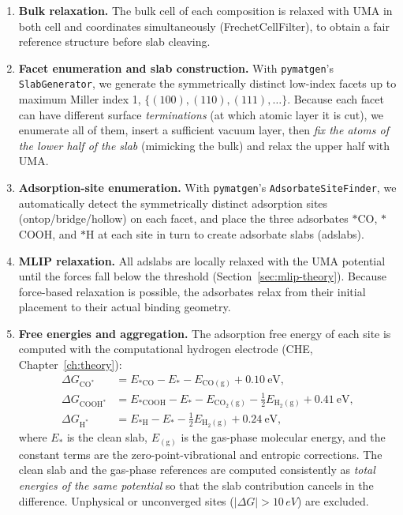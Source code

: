 \documentclass[11pt,a4paper]{report}
\providecommand{\SI}[2]{#1\,#2}
\newcommand{\dGCO}{\Delta G_{\mathrm{CO^*}}}
\newcommand{\dGH}{\Delta G_{\mathrm{H^*}}}
\newcommand{\dGCOOH}{\Delta G_{\mathrm{COOH^*}}}
\begin{document}
\begin{enumerate}[nosep,leftmargin=1.4em]
\item \textbf{Bulk relaxation.} The bulk cell of each composition is relaxed with UMA in both cell and coordinates simultaneously (FrechetCellFilter),
to obtain a fair reference structure before slab cleaving.
\item \textbf{Facet enumeration and slab construction.} With \texttt{pymatgen}'s \texttt{SlabGenerator}, we generate the symmetrically distinct low-index facets up to maximum Miller index 1,
$\{(100),(110),(111),\dots\}$. Because each facet can have different surface
\emph{terminations} (at which atomic layer it is cut), we enumerate all of them, insert a sufficient vacuum layer,
then \emph{fix the atoms of the lower half of the slab} (mimicking the bulk) and relax the upper half with UMA.
\item \textbf{Adsorption-site enumeration.} With \texttt{pymatgen}'s \texttt{AdsorbateSiteFinder}, we automatically detect the symmetrically
distinct adsorption sites (ontop/bridge/hollow) on each facet, and place the three adsorbates $*$CO, $*$COOH, and $*$H at each site in turn
to create adsorbate slabs (adslabs).
\item \textbf{MLIP relaxation.} All adslabs are locally relaxed with the UMA potential~\cite{uma2025} until the forces fall below the threshold
(Section~\ref{sec:mlip-theory}). Because force-based relaxation is possible, the adsorbates relax from their initial placement to their actual binding
geometry.
\item \textbf{Free energies and aggregation.} The adsorption free energy of each site is computed with the computational hydrogen electrode (CHE, Chapter~\ref{ch:theory}):
\begin{align}
\dGCO   &= E_{*\mathrm{CO}}   - E_{*} - E_{\mathrm{CO(g)}} + 0.10~\text{eV},\nonumber\\
\dGCOOH &= E_{*\mathrm{COOH}} - E_{*} - E_{\mathrm{CO_2(g)}} - \tfrac12 E_{\mathrm{H_2(g)}} + 0.41~\text{eV},\\
\dGH    &= E_{*\mathrm{H}}    - E_{*} - \tfrac12 E_{\mathrm{H_2(g)}} + 0.24~\text{eV},\nonumber
\end{align}
where $E_{*}$ is the clean slab, $E_{\mathrm{(g)}}$ is the gas-phase molecular energy, and the constant terms are the zero-point-vibrational and entropic
corrections. The clean slab and the gas-phase references are computed consistently as \emph{total energies of the same potential} so that the slab contribution
cancels in the difference. Unphysical or unconverged sites ($|\Delta G|>\SI{10}{eV}$) are excluded.
\end{enumerate}
\end{document}
